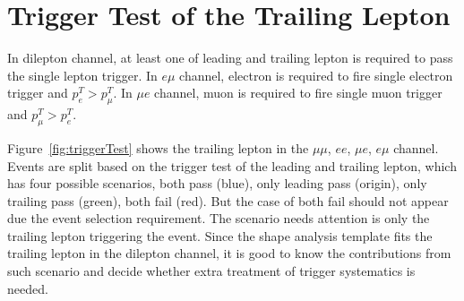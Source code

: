 \section{Trigger Test of the Trailing Lepton}

In dilepton channel, at least one of leading and trailing lepton is 
required to pass the single lepton trigger.
In $e\mu$ channel, electron is required to fire single electron trigger and $p^T_e>p^T_\mu$.
In $\mu e$ channel, muon is required to fire single muon trigger and $p^T_\mu>p^T_e$.


Figure~\ref{fig:triggerTest} shows the trailing lepton \pt in the $\mu\mu$, $ee$, $\mu e$, $e\mu$ channel.
Events are split based on the trigger test of the leading and trailing lepton, which has four possible
scenarios, both pass (blue), only leading pass (origin), only trailing pass (green), both fail (red).
But the case of both fail should not appear due the event selection requirement. The scenario needs
attention is only the trailing lepton triggering the event. Since the shape analysis template fits the
trailing lepton \pt in the dilepton channel, it is good to know the contributions from such scenario and
decide whether extra treatment of trigger systematics is needed.


